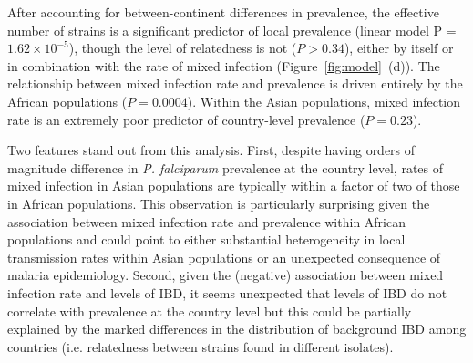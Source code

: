 \documentclass[9pt,lineno]{elife}
\begin{document}
After accounting for between-continent differences in prevalence, the effective number of strains is a significant predictor of local prevalence (linear model P = $1.62 \times 10^{-5}$), though the level of relatedness is not ($P>0.34$), either by itself or in combination with the rate of mixed infection (Figure~\ref{fig:model}~(d)).  The relationship between mixed infection rate and prevalence is driven entirely by the African populations ($P = 0.0004$).  Within the Asian populations, mixed infection rate is an extremely poor predictor of country-level prevalence ($P = 0.23$).

Two features stand out from this analysis.  First, despite having orders of magnitude difference in {\it P. falciparum} prevalence at the country level, rates of mixed infection in Asian populations are typically within a factor of two of those in African populations.  This observation is particularly surprising given the association between mixed infection rate and prevalence within African populations and could point to either substantial heterogeneity in local transmission rates within Asian populations or an unexpected consequence of malaria epidemiology.  Second, given the (negative) association between mixed infection rate and levels of IBD, it seems unexpected that levels of IBD do not correlate with prevalence at the country level but this could be partially explained by the marked differences in the distribution of background IBD among countries (i.e. relatedness between strains found in different isolates).
\end{document}
